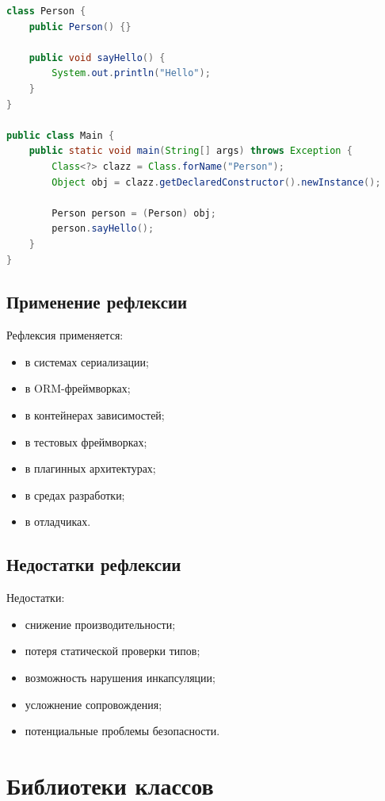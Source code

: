 \documentclass[12pt,a4paper]{article}
\begin{document}
\begin{lstlisting}[language=Java,caption={Создание объекта через рефлексию}]
class Person {
    public Person() {}

    public void sayHello() {
        System.out.println("Hello");
    }
}

public class Main {
    public static void main(String[] args) throws Exception {
        Class<?> clazz = Class.forName("Person");
        Object obj = clazz.getDeclaredConstructor().newInstance();

        Person person = (Person) obj;
        person.sayHello();
    }
}
\end{lstlisting}

\subsection{Применение рефлексии}

Рефлексия применяется:
\begin{itemize}
    \item в системах сериализации;
    \item в ORM-фреймворках;
    \item в контейнерах зависимостей;
    \item в тестовых фреймворках;
    \item в плагинных архитектурах;
    \item в средах разработки;
    \item в отладчиках.
\end{itemize}

\subsection{Недостатки рефлексии}

Недостатки:
\begin{itemize}
    \item снижение производительности;
    \item потеря статической проверки типов;
    \item возможность нарушения инкапсуляции;
    \item усложнение сопровождения;
    \item потенциальные проблемы безопасности.
\end{itemize}

\section{Библиотеки классов}
\end{document}
